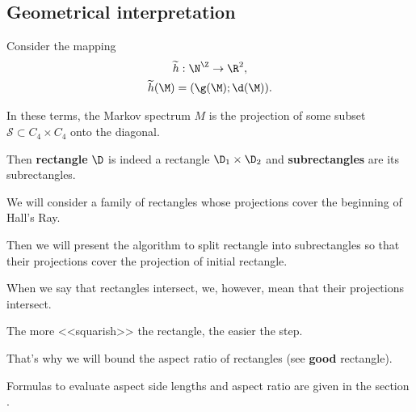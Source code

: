 \subsection{Geometrical interpretation}

Consider the mapping 
\begin{gather*}
	\widetilde{h}: \N^\Z \rightarrow \R^2,\\
	\widetilde{h}(\M) = (\g(\M); \d(\M)).
\end{gather*}

In these terms,
the Markov spectrum $M$
is the projection of some subset $\mathcal{S} \subset C_4 \times C_4$ onto the diagonal.

Then \textbf{rectangle} $\D$ is indeed a rectangle $\D_1 \times \D_2$
and \textbf{subrectangles} are its subrectangles.

We will consider a family of rectangles whose projections cover the beginning of Hall's Ray.

Then we will present the algorithm to split rectangle into subrectangles
so that their projections cover the projection of initial rectangle.

When we say that rectangles intersect, we, however, mean that their projections intersect.

The more <<squarish>> the rectangle, the easier the step.

That's why we will bound the aspect ratio of rectangles (see \textbf{good} rectangle).

Formulas to evaluate aspect side lengths and aspect ratio
are given in the section .
